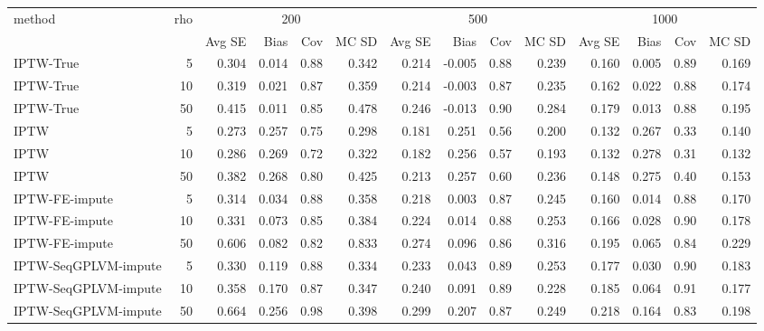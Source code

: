 \begin{tabular}{l r|rrrr|rrrr|rrrr}
\toprule
method & rho & \multicolumn{4}{c|}{200} & \multicolumn{4}{c|}{500} & \multicolumn{4}{c}{1000} \\
 &  & Avg SE & Bias & Cov & MC SD & Avg SE & Bias & Cov & MC SD & Avg SE & Bias & Cov & MC SD \\
\midrule
IPTW-True & 5 & 0.304 & 0.014 & 0.88 & 0.342 & 0.214 & -0.005 & 0.88 & 0.239 & 0.160 & 0.005 & 0.89 & 0.169 \\
IPTW-True & 10 & 0.319 & 0.021 & 0.87 & 0.359 & 0.214 & -0.003 & 0.87 & 0.235 & 0.162 & 0.022 & 0.88 & 0.174 \\
IPTW-True & 50 & 0.415 & 0.011 & 0.85 & 0.478 & 0.246 & -0.013 & 0.90 & 0.284 & 0.179 & 0.013 & 0.88 & 0.195 \\
IPTW & 5 & 0.273 & 0.257 & 0.75 & 0.298 & 0.181 & 0.251 & 0.56 & 0.200 & 0.132 & 0.267 & 0.33 & 0.140 \\
IPTW & 10 & 0.286 & 0.269 & 0.72 & 0.322 & 0.182 & 0.256 & 0.57 & 0.193 & 0.132 & 0.278 & 0.31 & 0.132 \\
IPTW & 50 & 0.382 & 0.268 & 0.80 & 0.425 & 0.213 & 0.257 & 0.60 & 0.236 & 0.148 & 0.275 & 0.40 & 0.153 \\
IPTW-FE-impute & 5 & 0.314 & 0.034 & 0.88 & 0.358 & 0.218 & 0.003 & 0.87 & 0.245 & 0.160 & 0.014 & 0.88 & 0.170 \\
IPTW-FE-impute & 10 & 0.331 & 0.073 & 0.85 & 0.384 & 0.224 & 0.014 & 0.88 & 0.253 & 0.166 & 0.028 & 0.90 & 0.178 \\
IPTW-FE-impute & 50 & 0.606 & 0.082 & 0.82 & 0.833 & 0.274 & 0.096 & 0.86 & 0.316 & 0.195 & 0.065 & 0.84 & 0.229 \\
IPTW-SeqGPLVM-impute & 5 & 0.330 & 0.119 & 0.88 & 0.334 & 0.233 & 0.043 & 0.89 & 0.253 & 0.177 & 0.030 & 0.90 & 0.183 \\
IPTW-SeqGPLVM-impute & 10 & 0.358 & 0.170 & 0.87 & 0.347 & 0.240 & 0.091 & 0.89 & 0.228 & 0.185 & 0.064 & 0.91 & 0.177 \\
IPTW-SeqGPLVM-impute & 50 & 0.664 & 0.256 & 0.98 & 0.398 & 0.299 & 0.207 & 0.87 & 0.249 & 0.218 & 0.164 & 0.83 & 0.198 \\
\bottomrule
\end{tabular}